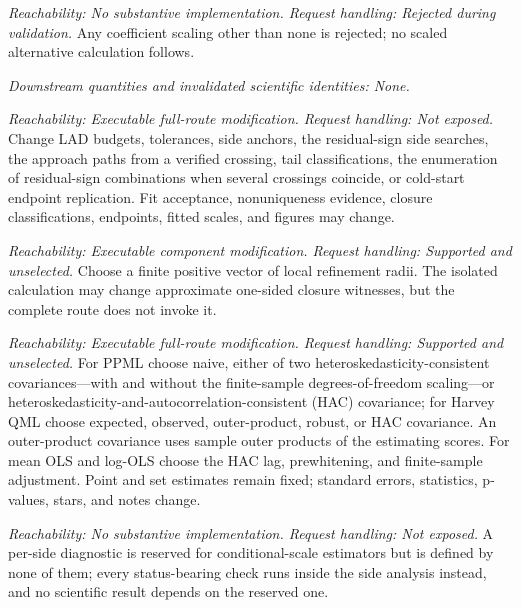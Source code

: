 \documentclass[11pt]{article}
\begin{document}
\begin{description}[style=nextline]
\item[Harvey QML coefficient scaling.]
\emph{Reachability: No substantive implementation. Request handling: Rejected during validation.}
Any coefficient scaling other than none is rejected; no scaled alternative calculation follows.

\emph{Downstream quantities and invalidated scientific identities: None.}

\item[LAD numerical controls.]
\emph{Reachability: Executable full-route modification. Request handling: Not exposed.}
Change LAD budgets, tolerances, side anchors, the residual-sign side searches, the approach paths
from a verified crossing, tail classifications, the enumeration of residual-sign combinations when
several crossings coincide, or cold-start endpoint replication. Fit acceptance, nonuniqueness evidence, closure classifications,
endpoints, fitted scales, and figures may change.

\item[Offline LAD closure refinement.]
\emph{Reachability: Executable component modification. Request handling: Supported and unselected.}
Choose a finite positive vector of local refinement radii. The isolated calculation may change
approximate one-sided closure witnesses, but the complete route does not invoke it.

\item[Analytic covariance choice.]
\emph{Reachability: Executable full-route modification. Request handling: Supported and unselected.}
For PPML choose naive, either of two heteroskedasticity-consistent covariances---with and without
the finite-sample degrees-of-freedom scaling---or heteroskedasticity-and-autocorrelation-consistent
(HAC) covariance; for Harvey QML choose expected, observed, outer-product, robust, or HAC
covariance. An outer-product covariance uses sample outer products of the estimating scores. For mean
OLS and log-OLS choose the HAC lag, prewhitening, and finite-sample adjustment. Point and set estimates remain fixed; standard
errors, statistics, p-values, stars, and notes change.

\item[Reserved per-side diagnostic.]
\emph{Reachability: No substantive implementation. Request handling: Not exposed.}
A per-side diagnostic is reserved for conditional-scale estimators but is defined by none of them;
every status-bearing check runs inside the side analysis instead, and no scientific result depends
on the reserved one.


\end{description}
\end{document}
